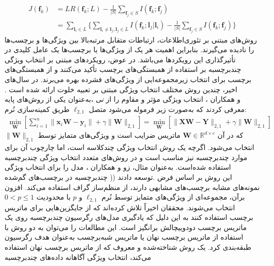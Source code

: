 	\begin{align}\label{LRFS}
	J(\bm{f}_k)&=LR(\bm{f}_k;{L})-\frac{1}{\lvert S \lvert}\sum_{\bm{f}_j \in S}^{}I(\bm{f}_k;\bm{f}_j)\nonumber\\
		&=\sum_{\bm{l}_i \in {L}}^{}\biggl\{{{\sum_{\bm{l}_i \neq \bm{l}_j, \bm{l}_j \in {L}}^{}} I(\bm{f}_k;\bm{l}_j|\bm{l}_i)-\frac{1}{\lvert S \lvert} \sum_{\bm{f}_j \in S}^{} I(\bm{f}_k;\bm{f}_j)}\biggl\}
	\end{align}   
	روش‌های مبتنی بر تئوری‌اطلاعات، ارتباطات متقابل مرتبه‌بالا بین ویژگی‌ها و برچسب‌ها را نادیده می‌گیرند. بنابراین اهمیت هر یک از ویژگی‌ها یا برچسب‌ها یک عامل کلیدی در تأثیرگذاری این رویکردها می‌باشد. در عوض، رویکردهای مبتنی بر انتخاب ویژگی‌ چندبرچسبه بر استفاده از همبستگی‌های برچسب تأکید می‌کنند و از همبستگی‌های برچسب برای انتخاب زیرمجموعه‌ایی از ویژگی‌های فشرده بهره می‌برند. در سال‌های اخیر، چندین روش مختلف انتخاب ویژگی مبتنی بر تعبیه خلوت ارائه شده است \cite{jian2016multi,NIPS2010_09c6c378,cai2013exact}. به‌عنوان یکی از روش‌های پایه، ‎\textit{نی}‎ و همکاران \cite{NIPS2010_09c6c378}،
	انتخاب ویژگی مؤثر و مقاوم را از طریق کمینه‌سازی نُرم‎ $\ell_{2,1} $ متصل‎  معرفی کردند که‌ به‌صورت زیر فرموله می‌شود:
	\begin{align}
		\min_{\bm{W}}[\sum_{i=1}^{n}\lVert\bm{x}_i\bm{W}-\bm{y}_i\rVert+ \gamma \lVert\bm{W}\rVert_{2,1}]=\min_{\bm{W}}[ \lVert\bm{XW}-\bm{Y}\rVert_{2,1}+ \gamma \lVert\bm{W}\rVert_{2,1}]
	\end{align}
	که در آن $\bm{W} \in \mathbb{R}^{d \times c}$ ماتریس ضرایب است و ویژگی‌های متمایز توسط $\lVert\bm{W}\rVert_{2,1}$ انتخاب می‌شود.
	اگرچه   یک روش انتخاب ویژگی چند‌کلاسه است، اما چارچوب آن برای موارد چندبرچسبه نیز مناسب است و در روش‌های متعدد انتخاب ویژگی چندبرچسبه استفاده شده‌است. به‌عنوان مثال، زو و همکاران \cite{zhu2018multi}، مدل  را برای انتخاب ویژگی چندبرچسبه در برچسب‌های گم‌شده )‎) توسعه دادند.‎‎ این روش بر اساس فرض نمونه‌های مشابه برچسب‌های مشابهی دارند، از منظم‌ساز گراف استفاده می‌کند. افزون بر‌آن، مجموعه‌‌‌ای از ویژگی‌های متمایز توسط نُرم $\ell_{2,1} $ و $p$ با محدودیت $0< p\leq1$ انتخاب می‌شوند. محققان اخیراً تلاش کرده‌اند که از جایگزین‌هایی برای ماتریس برچسب استفاده کنند به این دلیل که یادگیری مدل‌های رگرسیون چندبرچسبه روی یک ماتریس برچسب دودوییچالش برانگیز است. این مطالعات را می‌توان به دو روش با استفاده از ماتریس برچسب نهان یا ماتریس شبه‌برچسب به‌عنوان هدف رگرسیون طبقه‌بندی کرد. یک روش شناخته‌شده‌ و معروف که از ماتریس برچسب نهان استفاده می‌کند، انتخاب ویژگی آگاهانه داده‌های چندبرچسبه 
